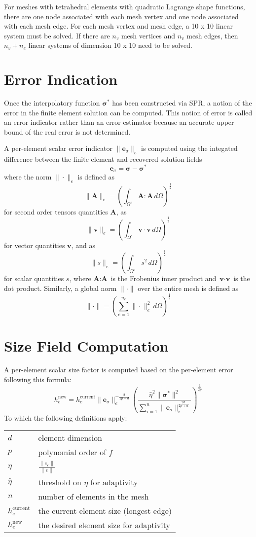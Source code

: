 \documentclass{article}
\begin{document}
For meshes with tetrahedral elements with quadratic Lagrange shape 
functions, there are one node associated with each mesh vertex and one
node associated with each mesh edge. For each mesh vertex and mesh edge, 
a 10 x 10 linear system must be solved. If there are $n_v$ mesh vertices
and $n_v$ mesh edges, then $n_v + n_e$ linear systems of dimension 10 x 10
need to be solved.

\section{Error Indication}
Once the interpolatory function $\boldsymbol{\sigma}^*$ has been
constructed via SPR, a notion of the error in the finite element solution
can be computed. This notion of error is called an error indicator rather
than an error estimator because an accurate upper bound of the real error
is not determined.

A per-element scalar error indicator $\|\textbf{e}_\sigma\|_e$ 
is computed using the integated difference between the finite element 
and recovered solution fields
\[
\textbf{e}_\sigma = \boldsymbol{\sigma - \sigma}^*
\]
where the norm $\|\cdot\|_e$ is defined as 
\[
\|\textbf{A}\|_e= \left( \int_{\Omega^e} 
\textbf{A} : \textbf{A} \, d\Omega \right)^\frac12
\]
for second order tensors quantities $\textbf{A}$, as
\[
\|\textbf{v}\|_e= \left( \int_{\Omega^e} 
\textbf{v} \cdot \textbf{v} \, d\Omega \right)^\frac12
\]
for vector quantities $\textbf{v}$, and as 
\[
\|s\|_e= \left( \int_{\Omega^e} 
s^2 \, d\Omega \right)^\frac12
\]
for scalar quantities $s$, where $\textbf{A}:\textbf{A}$ is the Frobenius 
inner product and $\textbf{v} \cdot \textbf{v}$ is the dot product. 
Similarly, a global norm $\|\cdot\|$ over the entire mesh is defined as
\[
\|\cdot\| = \left( \sum_{e=1}^{n_e} 
\| \cdot \|_e^2 \, d\Omega \right)^\frac12
\]

\section{Size Field Computation}
A per-element scalar size factor is computed based on the per-element 
error following this formula:
\[
h^\text{new}_e = h^\text{current}_e
\|\textbf{e}_\sigma\|^{-\frac{2}{2p+d}}_e
\left(
\frac
{\hat{\eta}^2\|\boldsymbol{\sigma}^*\|^2}
{\sum_{i=1}^n\|\textbf{e}_\sigma\|^\frac{2d}{2p+d}_i}
\right)^\frac{1}{2p}
\]
To which the following definitions apply:

\begin{center}
\begin{tabular}{ll}
$d$ & element dimension \\
$p$ & polynomial order of $f$ \\
$\eta$ & $\frac{\|e_\epsilon\|}{\|\epsilon\|}$ \\
$\hat{\eta}$ & threshold on $\eta$ for adaptivity \\
$n$ & number of elements in the mesh \\
$h_e^\text{current}$ & the current element size (longest edge) \\
$h_e^\text{new}$ & the desired element size for adaptivity \\
\end{tabular}
\end{center}
\end{document}
